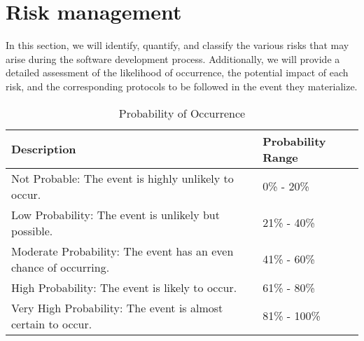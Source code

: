\documentclass{scrreprt}
\begin{document}
\section{Risk management}
In this section, we will identify, quantify, and classify the various risks that may arise during the software development process. Additionally, we will provide a detailed assessment of the likelihood of occurrence, the potential impact of each risk, and the corresponding protocols to be followed in the event they materialize.

\begin{table}[h!]
	\centering \small
	\renewcommand{\arraystretch}{1.5} %
	\begin{tabular}{|p{10cm}|p{5cm}|} %
		\hline
		\textbf{Description} & \textbf{Probability Range} \\ \hline
		Not Probable: The event is highly unlikely to occur. & 0\% - 20\% \\ \hline
		Low Probability: The event is unlikely but possible. & 21\% - 40\% \\ \hline
		Moderate Probability: The event has an even chance of occurring. & 41\% - 60\% \\ \hline
		High Probability: The event is likely to occur. & 61\% - 80\% \\ \hline
		Very High Probability: The event is almost certain to occur. & 81\% - 100\% \\ \hline
	\end{tabular}
	\caption{Probability of Occurrence}
\end{table} \FloatBarrier

\end{document}
